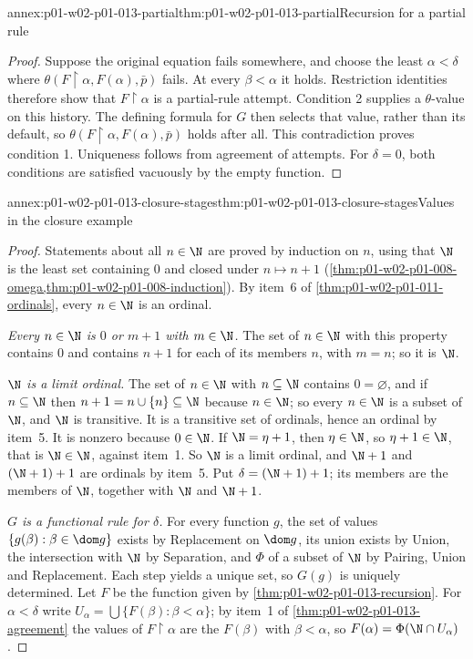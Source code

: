 \begin{annexitem}{annex:p01-w02-p01-013-partial}{thm:p01-w02-p01-013-partial}{Recursion for a partial rule}
\begin{proof}
Suppose the original equation fails somewhere, and choose the least
\(\alpha<\delta\) where
\(\theta(F\mathbin{\upharpoonright}\alpha,F(\alpha),\bar p)\) fails.
At every \(\beta<\alpha\) it holds. Restriction identities therefore show
that \(F\mathbin{\upharpoonright}\alpha\) is a partial-rule attempt.
Condition 2 supplies a \(\theta\)-value on this history. The defining
formula for \(G\) then selects that value, rather than its default, so
\(\theta(F\mathbin{\upharpoonright}\alpha,F(\alpha),\bar p)\) holds after
all. This contradiction proves condition 1. Uniqueness follows from
agreement of attempts. For \(\delta=0\), both conditions are satisfied
vacuously by the empty function.
\end{proof}
\end{annexitem}

\begin{annexitem}{annex:p01-w02-p01-013-closure-stages}{thm:p01-w02-p01-013-closure-stages}{Values in the closure example}
\begin{proof}
Statements about all \(n\in\N\) are proved by induction on \(n\), using that
\(\N\) is the least set containing \(0\) and closed under \(n\mapsto n+1\)
(\cref{thm:p01-w02-p01-008-omega,thm:p01-w02-p01-008-induction}). By item~6 of
\cref{thm:p01-w02-p01-011-ordinals}, every \(n\in\N\) is an ordinal.

\emph{Every \(n\in\N\) is \(0\) or \(m+1\) with \(m\in\N\).} The set of
\(n\in\N\) with this property contains \(0\) and contains \(n+1\) for each of
its members \(n\), with \(m=n\); so it is \(\N\).

\emph{\(\N\) is a limit ordinal.} The set of \(n\in\N\) with
\(n\subseteq\N\) contains \(0=\varnothing\), and if \(n\subseteq\N\) then
\(n+1=n\cup\{n\}\subseteq\N\) because \(n\in\N\); so every \(n\in\N\) is a
subset of \(\N\), and \(\N\) is transitive. It is a transitive set of
ordinals, hence an ordinal by item~5. It is nonzero because \(0\in\N\). If
\(\N=\eta+1\), then \(\eta\in\N\), so \(\eta+1\in\N\), that is
\(\N\in\N\), against item~1. So \(\N\) is a limit ordinal, and \(\N+1\) and
\((\N+1)+1\) are ordinals by item~5. Put \(\delta=(\N+1)+1\); its members are
the members of \(\N\), together with \(\N\) and \(\N+1\).

\emph{\(G\) is a functional rule for \(\delta\).} For every function \(g\),
the set of values \(\{g(\beta):\beta\in\dom g\}\) exists by Replacement on
\(\dom g\), its union exists by Union, the intersection with \(\N\) by
Separation, and \(\Phi\) of a subset of \(\N\) by Pairing, Union and
Replacement. Each step yields a unique set, so \(G(g)\) is uniquely
determined. Let \(F\) be the function given by
\cref{thm:p01-w02-p01-013-recursion}. For \(\alpha<\delta\) write
\(U_\alpha=\bigcup\{F(\beta):\beta<\alpha\}\); by item~1 of
\cref{thm:p01-w02-p01-013-agreement} the values of
\(F\mathbin{\upharpoonright}\alpha\) are the \(F(\beta)\) with
\(\beta<\alpha\), so \(F(\alpha)=\Phi(\N\cap U_\alpha)\).


\end{proof}
\end{annexitem}
